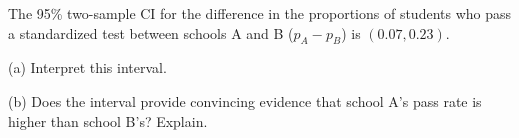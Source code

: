 \documentclass[10pt]{article}
\begin{document}
\begin{practicebox}
The 95\% two-sample CI for the difference in the proportions of students who pass a
standardized test between schools A and B ($p_A - p_B$) is $(0.07, 0.23)$.

(a) Interpret this interval. 

(b) Does the interval provide convincing evidence that school A's pass rate is higher
than school B's? Explain. 
\end{practicebox}
\end{document}
